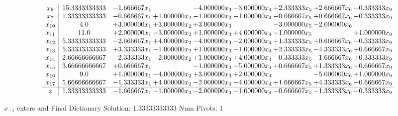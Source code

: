 \documentclass[10pt]{article}
\begin{document}
 \[\begin{array}{c| c c@{\hskip 2pt} c@{\hskip 2pt} c@{\hskip 2pt} c@{\hskip 2pt} c@{\hskip 2pt} c@{\hskip 2pt} c@{\hskip 2pt} }
 x_{8}   &  15.3333333333 & -1.666667 x_{1} &   & -4.000000 x_{3} & -3.000000 x_{4} & + 2.333333 x_{5} & + 2.666667 x_{6} & -0.333333 x_{9}\\
 x_{7}   &  1.33333333333 & -0.666667 x_{1} & + 1.000000 x_{2} & -1.000000 x_{3} & -1.000000 x_{4} & -0.666667 x_{5} & + 0.666667 x_{6} & -0.333333 x_{9}\\
 x_{10}   &  4.0 & + 3.000000 x_{1} & + 3.000000 x_{2} & + 3.000000 x_{3} &   & -3.000000 x_{5} & -2.000000 x_{6} &   \\
 x_{11}   &  11.0 & + 2.000000 x_{1} & -3.000000 x_{2} & + 1.000000 x_{3} & + 4.000000 x_{4} & -1.000000 x_{5} &   & + 1.000000 x_{9}\\
 x_{12}   &  5.33333333333 & -2.666667 x_{1} & + 4.000000 x_{2} & -4.000000 x_{3} & -2.000000 x_{4} & + 1.333333 x_{5} & + 0.666667 x_{6} & -0.333333 x_{9}\\
 x_{13}   &  5.33333333333 & + 3.333333 x_{1} & -1.000000 x_{2} & + 1.000000 x_{3} & -1.000000 x_{4} & + 2.333333 x_{5} & -4.333333 x_{6} & + 0.666667 x_{9}\\
 x_{14}   &  2.66666666667 & -2.333333 x_{1} & -2.000000 x_{2} & + 1.000000 x_{3} & + 4.000000 x_{4} & -0.333333 x_{5} & -1.666667 x_{6} & + 0.333333 x_{9}\\
 x_{15}   &  3.66666666667 & + 0.666667 x_{1} &   & -1.000000 x_{3} & -5.000000 x_{4} & + 0.666667 x_{5} & + 1.333333 x_{6} & -0.666667 x_{9}\\
 x_{16}   &  9.0 & + 1.000000 x_{1} & -4.000000 x_{2} & + 3.000000 x_{3} & + 2.000000 x_{4} &   & -5.000000 x_{6} & + 1.000000 x_{9}\\
 x_{17}   &  5.66666666667 & -1.333333 x_{1} & + 4.000000 x_{2} & -2.000000 x_{3} & -4.000000 x_{4} & + 1.666667 x_{5} & + 4.333333 x_{6} & -0.666667 x_{9}\\
\hline
z    &  1.33333333333 & -1.666667 x_{1} & -1.000000 x_{2} & -2.000000 x_{3} & -1.000000 x_{4} & -0.666667 x_{5} & -1.333333 x_{6} & -0.333333 x_{9}\\
\end{array}\]


 $ x_{-1} $ enters and Final Dictionary
Solution:  1.33333333333
Num Pivots:  1
\end{document}
